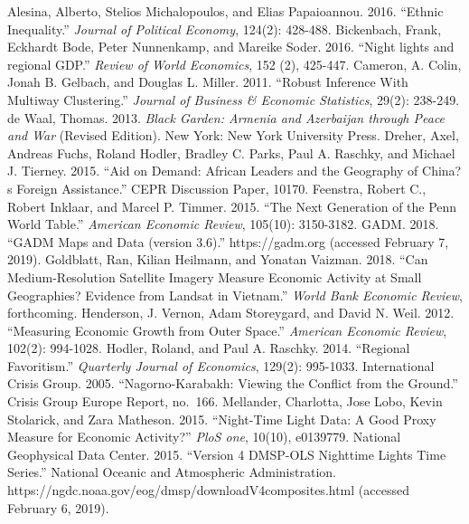 \documentclass[12pt,a4paper]{article}%
\begin{document}
\begin{thebibliography}{99}                                                                                                %
\bibitem{} Alesina, Alberto, Stelios Michalopoulos, and Elias Papaioannou. 2016. ``Ethnic Inequality.'' \textit{Journal of Political Economy}, 124(2): 428-488.
\bibitem{} Bickenbach, Frank, Eckhardt Bode, Peter Nunnenkamp, and Mareike Soder. 2016. ``Night lights and regional GDP.'' \textit{Review of World Economics}, 152 (2), 425-447.                                                                                         
\bibitem{} Cameron, A. Colin, Jonah B. Gelbach, and Douglas L. Miller. 2011. ``Robust Inference With Multiway Clustering.'' \textit{Journal of Business \& Economic Statistics}, 29(2): 238-249.
\bibitem{} de Waal, Thomas. 2013. \textit{Black Garden: Armenia and Azerbaijan through Peace and War} (Revised Edition). New York: New York University Press.
\bibitem{} Dreher, Axel, Andreas Fuchs, Roland Hodler, Bradley C. Parks, Paul A. Raschky, and Michael J. Tierney. 2015. ``Aid on Demand: African Leaders and the Geography of China?s Foreign Assistance.'' CEPR Discussion Paper, 10170.
\bibitem{} Feenstra, Robert C., Robert Inklaar, and Marcel P. Timmer. 2015. ``The Next Generation of the Penn World Table.'' \textit{American Economic Review}, 105(10): 3150-3182.
\bibitem{} GADM. 2018. ``GADM Maps and Data (version 3.6).'' https://gadm.org (accessed February 7, 2019).
\bibitem{} Goldblatt, Ran, Kilian Heilmann, and Yonatan Vaizman. 2018. ``Can Medium-Resolution Satellite Imagery Measure Economic Activity at Small Geographies? Evidence from Landsat in Vietnam.'' \textit{World Bank Economic Review}, forthcoming.
\bibitem{} Henderson, J. Vernon, Adam Storeygard, and David N. Weil. 2012. ``Measuring Economic Growth from Outer Space.'' \textit{American Economic Review}, 102(2): 994-1028.
\bibitem{} Hodler, Roland, and Paul A. Raschky. 2014. ``Regional Favoritism.'' \textit{Quarterly Journal of Economics}, 129(2): 995-1033.
\bibitem{} International Crisis Group. 2005. ``Nagorno-Karabakh: Viewing the Conflict from the Ground.'' Crisis Group Europe Report, no.\ 166.
\bibitem{} Mellander, Charlotta, Jose Lobo, Kevin Stolarick, and Zara Matheson. 2015. ``Night-Time Light Data: A Good Proxy Measure for Economic Activity?'' \textit{PloS one}, 10(10), e0139779.
\bibitem{} National Geophysical Data Center. 2015. ``Version 4 DMSP-OLS Nighttime Lights Time Series.'' National Oceanic and Atmospheric Administration. https://ngdc.noaa.gov/eog/dmsp/downloadV4composites.html (accessed February 6, 2019).

\end{thebibliography}
\end{document}
